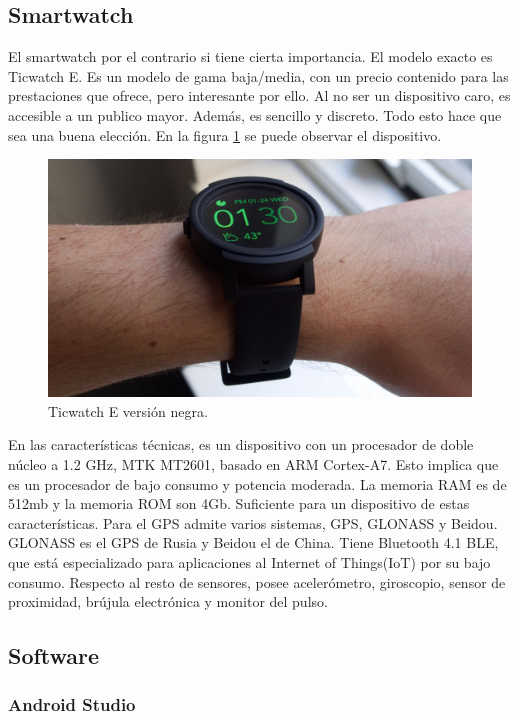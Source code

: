\documentclass[12pt]{article}
\numberwithin{equation}{section}
\begin{document}
\subsection{Smartwatch}
El smartwatch por el contrario si tiene cierta importancia. El modelo exacto es Ticwatch E. Es un modelo de gama baja/media, con un precio contenido para las prestaciones que ofrece, pero interesante por ello. Al no ser un dispositivo caro, es accesible a un publico mayor. Además, es sencillo y discreto. Todo esto hace que sea una buena elección. En la figura \ref{fig:ticwatch} se puede observar el dispositivo.

\begin{figure}[h]
    \centering
    \includegraphics[width=1\textwidth]{ticwatche.jpg}
    \caption{Ticwatch E versión negra.}
    \label{fig:ticwatch}
\end{figure}

En las características técnicas, es un dispositivo con un procesador de doble núcleo a 1.2 GHz, MTK MT2601, basado en ARM Cortex-A7. Esto implica que es un procesador de bajo consumo y potencia moderada. La memoria RAM es de 512mb y la memoria ROM son 4Gb. Suficiente para un dispositivo de estas características. Para el GPS admite varios sistemas, GPS, GLONASS y Beidou. GLONASS es el GPS de Rusia y Beidou el de China. Tiene Bluetooth 4.1 BLE, que está especializado para aplicaciones al Internet of Things(IoT) por su bajo consumo. Respecto al resto de sensores, posee acelerómetro, giroscopio, sensor de proximidad, brújula electrónica y monitor del pulso.

\subsection{Software}

\subsubsection{Android Studio}
\end{document}

